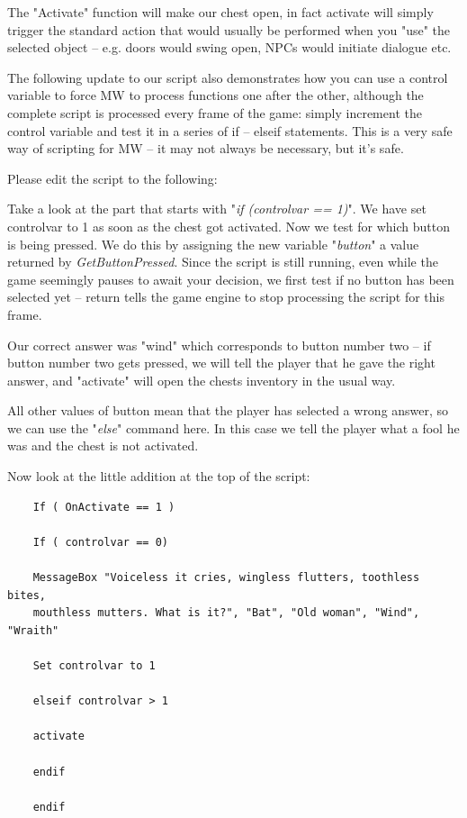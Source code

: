 The "Activate" function will make our chest open, in fact activate will simply trigger the standard action that would usually be performed when you "use" the selected object -- e.g. doors would swing open, NPCs would initiate dialogue etc.

The following update to our script also demonstrates how you can use a control variable to force MW to process functions one after the other, although the complete script is processed every frame of the game: simply increment the control variable and test it in a series of if -- elseif statements. This is a very safe way of scripting for MW -- it may not always be necessary, but it's safe.

Please edit the script to the following:



Take a look at the part that starts with "\emph{if (controlvar == 1)}". We have set controlvar to 1 as soon as the chest got activated. Now we test for which button is being pressed. We do this by assigning the new variable "\emph{button}" a value returned by \emph{GetButtonPressed}. Since the script is still running, even while the game seemingly pauses to await your decision, we first test if no button has been selected yet -- return tells the game engine to stop processing the script for this frame.

Our correct answer was "wind" which corresponds to button number two -- if button number two gets pressed, we will tell the player that he gave the right answer, and "activate" will open the chests inventory in the usual way.

All other values of button mean that the player has selected a wrong answer, so we can use the "\emph{else}" command here. In this case we tell the player what a fool he was and the chest is not activated.

Now look at the little addition at the top of the script:


\begin{lstlisting}
	If ( OnActivate == 1 )
	
	If ( controlvar == 0)
	
	MessageBox "Voiceless it cries, wingless flutters, toothless bites,
	mouthless mutters. What is it?", "Bat", "Old woman", "Wind", "Wraith"
	
	Set controlvar to 1
	
	elseif controlvar > 1
	
	activate
	
	endif
	
	endif
\end{lstlisting}

